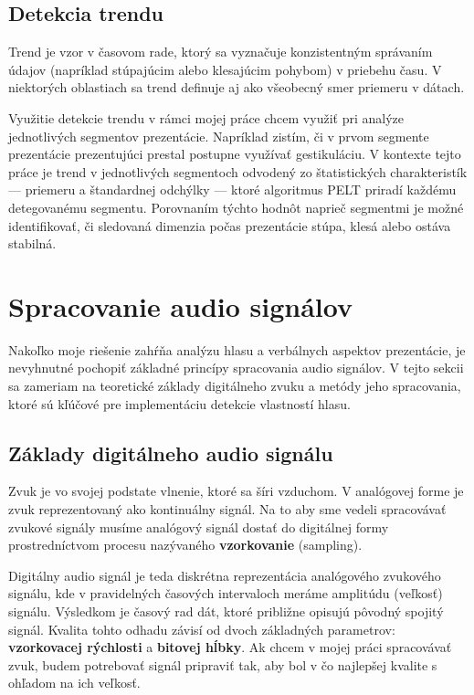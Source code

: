 \subsection{Detekcia trendu}
Trend je vzor v časovom rade, ktorý sa vyznačuje konzistentným správaním údajov (napríklad stúpajúcim alebo klesajúcim pohybom) v priebehu času\cite{timeSeriesTrend}. V niektorých oblastiach sa trend definuje aj ako všeobecný smer priemeru v dátach\cite{timeSeriesTrendAlgo}.

Využitie detekcie trendu v rámci mojej práce chcem využiť pri analýze jednotlivých segmentov prezentácie. Napríklad zistím, či v prvom segmente prezentácie prezentujúci prestal postupne využívať gestikuláciu. V kontexte tejto práce je trend v jednotlivých segmentoch odvodený zo štatistických charakteristík --- priemeru a štandardnej odchýlky --- ktoré algoritmus PELT priradí každému detegovanému segmentu. Porovnaním týchto hodnôt naprieč segmentmi je možné identifikovať, či sledovaná dimenzia počas prezentácie stúpa, klesá alebo ostáva stabilná.

\section{Spracovanie audio signálov}

Nakoľko moje riešenie zahŕňa analýzu hlasu a verbálnych aspektov prezentácie, je nevyhnutné pochopiť základné princípy spracovania audio signálov. V tejto sekcii sa zameriam na teoretické základy digitálneho zvuku a metódy jeho spracovania, ktoré sú kľúčové pre implementáciu detekcie vlastností hlasu.

\subsection{Základy digitálneho audio signálu}

Zvuk je vo svojej podstate vlnenie, ktoré sa šíri vzduchom. V analógovej forme je zvuk reprezentovaný ako kontinuálny signál. Na to aby sme vedeli spracovávať zvukové signály musíme analógový signál dostať do digitálnej formy prostredníctvom procesu nazývaného \textbf{vzorkovanie} (sampling)\cite{audioSignalProcessing}.

Digitálny audio signál je teda diskrétna reprezentácia analógového zvukového signálu, kde v pravidelných časových intervaloch meráme amplitúdu (veľkosť) signálu. Výsledkom je časový rad dát, ktoré približne opisujú pôvodný spojitý signál\cite{audioSignalProcessing}. Kvalita tohto odhadu závisí od dvoch základných parametrov: \textbf{vzorkovacej rýchlosti} a \textbf{bitovej hĺbky}. Ak chcem v mojej práci spracovávať zvuk, budem potrebovať signál pripraviť tak, aby bol v čo najlepšej kvalite s ohľadom na ich veľkosť.


